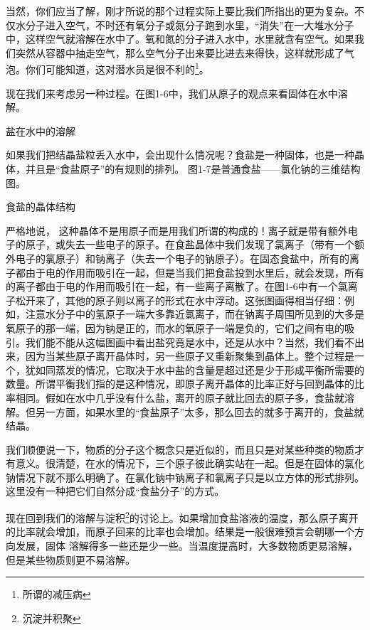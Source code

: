 \documentclass[11pt,oneside]{book}
\begin{document}
\begin{common-format}
当然，你们应当了解，刚才所说的那个过程实际上要比我们所指出的更为复杂。不仅水分子进入空气，不时还有氧分子或氮分子跑到水里，“消失”在一大堆水分子中，这样空气就溶解在水中了。氧和氮的分子进入水中，水里就含有空气。如果我们突然从容器中抽走空气，那么空气分子出来要比进去来得快，这样就形成了气泡。你们可能知道，这对潜水员是很不利的\footnote{所谓的减压病}。

现在我们来考虑另一种过程。在图1-6中，我们从原子的观点来看固体在水中溶解。
\begin{fig}{盐在水中的溶解}
\label{fig:盐在水中的溶解}
\end{fig}
如果我们把结晶盐粒丢入水中，会出现什么情况呢？食盐是一种固体，也是一种晶体，并且是“食盐原子”的有规则的排列。
图1-7是普通食盐——氯化钠的三维结构图。
\begin{fig}{食盐的晶体结构}
\label{fig:食盐的晶体结构}
\end{fig}
严格地说， 这种晶体不是用原子而是用我们所谓的构成的！离子就是带有额外电子的原子，或失去一些电子的原子。在食盐晶体中我们发现了氯离子（带有一个额外电子的氯原子）和钠离子（失去一个电子的钠原子）。在固态食盐中，所有的离子都由于电的作用而吸引在一起，但是当我们把食盐投到水里后，就会发现，所有的离子都由于电的作用而吸引在一起，有一些离子离散了。在图1-6中有一个氯离子松开来了，其他的原子则以离子的形式在水中浮动。这张图画得相当仔细：例如，注意水分子中的氢原子一端大多靠近氯离子，而在钠离子周围所见到的大多是氧原子的那一端，因为钠是正的，而水的氧原子一端是负的，它们之间有电的吸引。我们能不能从这幅图画中看出盐究竟是水中，还是从水中？当然，我们看不出来，因为当某些原子离开晶体时，另一些原子又重新聚集到晶体上。整个过程是一个，犹如同蒸发的情况，它取决于水中盐的含量是超过还是少于形成平衡所需要的数量。所谓平衡我们指的是这种情况，即原子离开晶体的比率正好与回到晶体的比率相同。假如在水中几乎没有什么盐，离开的原子就比回去的原子多，食盐就溶解。但另一方面，如果水里的“食盐原子”太多，那么回去的就多于离开的，食盐就结晶。

我们顺便说一下，物质的分子这个概念只是近似的，而且只是对某些种类的物质才有意义。很清楚，在水的情况下，三个原子彼此确实站在一起。但是在固体的氯化钠情况下就不那么明确了。在氯化钠中钠离子和氯离子只是以立方体的形式排列。这里没有一种把它们自然分成“食盐分子”的方式。

现在回到我们的溶解与淀积\footnote{沉淀并积聚}的讨论上。如果增加食盐溶液的温度，那么原子离开的比率就会增加，而原子回来的比率也会增加。结果是一般很难预言会朝哪一个方向发展，固体
溶解得多一些还是少一些。当温度提高时，大多数物质更易溶解， 但是某些物质则更不易溶解。


\end{common-format}
\end{document}
